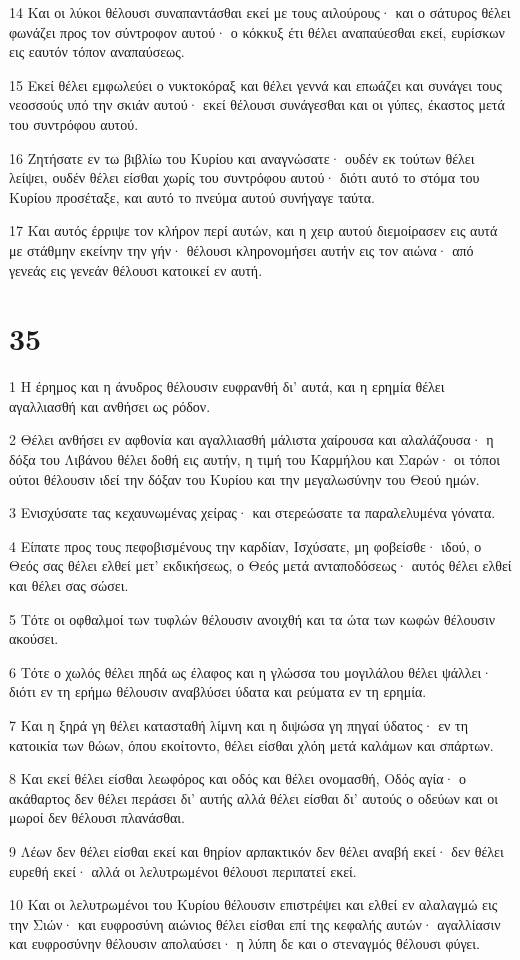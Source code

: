 \par 14 Και οι λύκοι θέλουσι συναπαντάσθαι εκεί με τους αιλούρους· και ο σάτυρος θέλει φωνάζει προς τον σύντροφον αυτού· ο κόκκυξ έτι θέλει αναπαύεσθαι εκεί, ευρίσκων εις εαυτόν τόπον αναπαύσεως.
\par 15 Εκεί θέλει εμφωλεύει ο νυκτοκόραξ και θέλει γεννά και επωάζει και συνάγει τους νεοσσούς υπό την σκιάν αυτού· εκεί θέλουσι συνάγεσθαι και οι γύπες, έκαστος μετά του συντρόφου αυτού.
\par 16 Ζητήσατε εν τω βιβλίω του Κυρίου και αναγνώσατε· ουδέν εκ τούτων θέλει λείψει, ουδέν θέλει είσθαι χωρίς του συντρόφου αυτού· διότι αυτό το στόμα του Κυρίου προσέταξε, και αυτό το πνεύμα αυτού συνήγαγε ταύτα.
\par 17 Και αυτός έρριψε τον κλήρον περί αυτών, και η χειρ αυτού διεμοίρασεν εις αυτά με στάθμην εκείνην την γήν· θέλουσι κληρονομήσει αυτήν εις τον αιώνα· από γενεάς εις γενεάν θέλουσι κατοικεί εν αυτή.

\chapter{35}

\par 1 Η έρημος και η άνυδρος θέλουσιν ευφρανθή δι' αυτά, και η ερημία θέλει αγαλλιασθή και ανθήσει ως ρόδον.
\par 2 Θέλει ανθήσει εν αφθονία και αγαλλιασθή μάλιστα χαίρουσα και αλαλάζουσα· η δόξα του Λιβάνου θέλει δοθή εις αυτήν, η τιμή του Καρμήλου και Σαρών· οι τόποι ούτοι θέλουσιν ιδεί την δόξαν του Κυρίου και την μεγαλωσύνην του Θεού ημών.
\par 3 Ενισχύσατε τας κεχαυνωμένας χείρας· και στερεώσατε τα παραλελυμένα γόνατα.
\par 4 Είπατε προς τους πεφοβισμένους την καρδίαν, Ισχύσατε, μη φοβείσθε· ιδού, ο Θεός σας θέλει ελθεί μετ' εκδικήσεως, ο Θεός μετά ανταποδόσεως· αυτός θέλει ελθεί και θέλει σας σώσει.
\par 5 Τότε οι οφθαλμοί των τυφλών θέλουσιν ανοιχθή και τα ώτα των κωφών θέλουσιν ακούσει.
\par 6 Τότε ο χωλός θέλει πηδά ως έλαφος και η γλώσσα του μογιλάλου θέλει ψάλλει· διότι εν τη ερήμω θέλουσιν αναβλύσει ύδατα και ρεύματα εν τη ερημία.
\par 7 Και η ξηρά γη θέλει κατασταθή λίμνη και η διψώσα γη πηγαί ύδατος· εν τη κατοικία των θώων, όπου εκοίτοντο, θέλει είσθαι χλόη μετά καλάμων και σπάρτων.
\par 8 Και εκεί θέλει είσθαι λεωφόρος και οδός και θέλει ονομασθή, Οδός αγία· ο ακάθαρτος δεν θέλει περάσει δι' αυτής αλλά θέλει είσθαι δι' αυτούς ο οδεύων και οι μωροί δεν θέλουσι πλανάσθαι.
\par 9 Λέων δεν θέλει είσθαι εκεί και θηρίον αρπακτικόν δεν θέλει αναβή εκεί· δεν θέλει ευρεθή εκεί· αλλά οι λελυτρωμένοι θέλουσι περιπατεί εκεί.
\par 10 Και οι λελυτρωμένοι του Κυρίου θέλουσιν επιστρέψει και ελθεί εν αλαλαγμώ εις την Σιών· και ευφροσύνη αιώνιος θέλει είσθαι επί της κεφαλής αυτών· αγαλλίασιν και ευφροσύνην θέλουσιν απολαύσει· η λύπη δε και ο στεναγμός θέλουσι φύγει.

